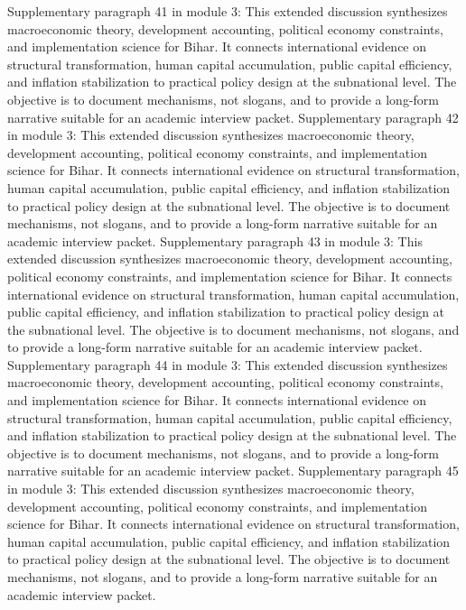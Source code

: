 \documentclass[preprint,12pt]{elsarticle}
\begin{document}
Supplementary paragraph 41 in module 3: This extended discussion synthesizes macroeconomic theory, development accounting, political economy constraints, and implementation science for Bihar. It connects international evidence on structural transformation, human capital accumulation, public capital efficiency, and inflation stabilization to practical policy design at the subnational level. The objective is to document mechanisms, not slogans, and to provide a long-form narrative suitable for an academic interview packet.
Supplementary paragraph 42 in module 3: This extended discussion synthesizes macroeconomic theory, development accounting, political economy constraints, and implementation science for Bihar. It connects international evidence on structural transformation, human capital accumulation, public capital efficiency, and inflation stabilization to practical policy design at the subnational level. The objective is to document mechanisms, not slogans, and to provide a long-form narrative suitable for an academic interview packet.
Supplementary paragraph 43 in module 3: This extended discussion synthesizes macroeconomic theory, development accounting, political economy constraints, and implementation science for Bihar. It connects international evidence on structural transformation, human capital accumulation, public capital efficiency, and inflation stabilization to practical policy design at the subnational level. The objective is to document mechanisms, not slogans, and to provide a long-form narrative suitable for an academic interview packet.
Supplementary paragraph 44 in module 3: This extended discussion synthesizes macroeconomic theory, development accounting, political economy constraints, and implementation science for Bihar. It connects international evidence on structural transformation, human capital accumulation, public capital efficiency, and inflation stabilization to practical policy design at the subnational level. The objective is to document mechanisms, not slogans, and to provide a long-form narrative suitable for an academic interview packet.
Supplementary paragraph 45 in module 3: This extended discussion synthesizes macroeconomic theory, development accounting, political economy constraints, and implementation science for Bihar. It connects international evidence on structural transformation, human capital accumulation, public capital efficiency, and inflation stabilization to practical policy design at the subnational level. The objective is to document mechanisms, not slogans, and to provide a long-form narrative suitable for an academic interview packet.
\end{document}
